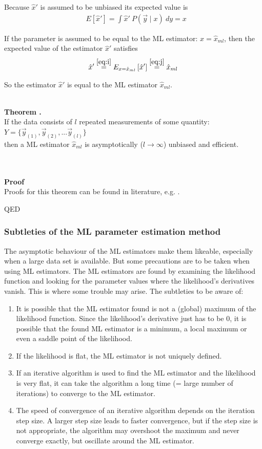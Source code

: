 \documentclass[report,12pt]{report}
\newcounter{theorem}
\newcounter{chpt}
\newcommand{\theorem}[2]
	{
		\hfill\\
		\textbf{Theorem \arabic{chpt}.\arabic{theorem}}\\
		#1
		\hfill\\
		\hfill\\
		\textbf{Proof}\\
		#2
		\begin{flushright}QED\end{flushright}
		\stepcounter{theorem}
}
\begin{document}
{Because $\hat x'$ is assumed to be unbiased its expected value is
\begin{align}
	&E\left[ \hat x' \right] = 
	\int \hat x'\ P(\vec y \mid x )\ dy = x
	\label{eq:j}
\end{align}

If the parameter is assumed to be equal to the ML estimator: $x = \hat x_{ml}$, then the expected value of the estimator $\hat x'$ satisfies
\begin{align}
	\hat x' \stackrel{\ref{eq:i}}{=} E_{x=\hat x_{ml}}\left[\hat x' \right] 
	\stackrel{\ref{eq:j}}{=} \hat x_{ml}
\end{align}

So the estimator $\hat x'$ is equal to the ML estimator $\hat x_{ml}$.
}

\theorem
{
If the data consists of $l$ repeated measurements of some quantity: \\
$Y = \{\vec y_{(1)}, \vec y_{(2)}, ... \vec y_{(l)}\}$ \\then a ML estimator $\hat x_{ml}$ is asymptotically ($l \rightarrow \infty$) unbiased and efficient.
}
{
Proofs for this theorem can be found in literature, e.g. \cite{stat2}.
}




\subsubsection*{Subtleties of the ML parameter estimation method}
The asymptotic behaviour of the ML estimators make them likeable, especially when a large data set is available. But some precautions are to be taken when using ML estimators. The ML estimators are found by examining the likelihood function and looking for the parameter values where the likelihood's derivatives vanish. This is where some trouble may arise. The subtleties to be aware of:

\begin{enumerate}
	\item It is possible that the ML estimator found is not a (global) maximum of the likelihood function. Since the likelihood's derivative just has to be 0, it is possible that the found ML estimator is a minimum, a local maximum or even a saddle point of the likelihood.
	
		\item If the likelihood is flat, the ML estimator is not uniquely defined.

	\item If an iterative algorithm is used to find the ML estimator and the likelihood is very flat, it can take the algorithm a long time (= large number of iterations) to converge to the ML estimator.
	
	\item The speed of convergence of an iterative algorithm depends on the iteration step size. A larger step size leads to faster convergence, but if the step size is not appropriate, the algorithm may overshoot the maximum and never converge exactly, but oscillate around the ML estimator.
\end{enumerate}
\end{document}
